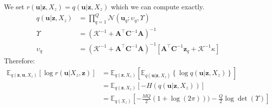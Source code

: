 \documentclass[12pt]{article}
\newcommand{\Kappa}{\mathcal{K}}
\newcommand{\ub}{\mathbf{u}}
\newcommand{\zb}{\mathbf{z}}
\newcommand{\Cb}{\mathbf{C}}
\newcommand{\Ab}{\mathbf{A}}
\newcommand{\Kzz}{\mathbf{K}_{zz}}
\newcommand{\Kuu}{\mathbf{K}_{uu}}
\newcommand{\Kuz}{\mathbf{K}_{uz}}
\newcommand{\Kzu}{\mathbf{K}_{zu}}
\newcommand{\Ex}{\mathbb{E}}
\begin{document}
%
We set $r(\ub|\zb,X_z) = q(\ub|\zb,X_z)$ which we can compute exactly.
%
\begin{align}
q(\ub|\zb,X_z) &= \prod_{q=1}^Q \mathcal{N}(\ub_q; \upsilon_q, \Upsilon) \\
\Upsilon &= (\Kappa^{-1} + \Ab^\top\Cb^{-1}\Ab)^{-1} \\
\upsilon_q &= (\Kappa^{-1} + \Ab^\top\Cb^{-1}\Ab)^{-1}[\Ab^\top \Cb^{-1}\zb_q + \Kappa^{-1}\kappa]
\end{align}
%
Therefore:
%
\begin{align}
\Ex_{q(\zb,\ub,X_z)}\left[\log r(\ub|X_z,\zb)\right] &= \Ex_{q(\zb,X_z)}\left[ \Ex_{q(\ub|\zb,X_z)} \left\{\log q(\ub|\zb,X_z) \right\} \right] \\
&= \Ex_{q(\zb,X_z)}\left[-H(q(\ub|\zb,X_z)) \right] \\
&= \Ex_{q(X_z)}\left[-\frac{MQ}{2}(1+\log(2\pi))) -\frac{Q}{2}\log\det(\Upsilon) \right]
\end{align}
%
\end{document}
